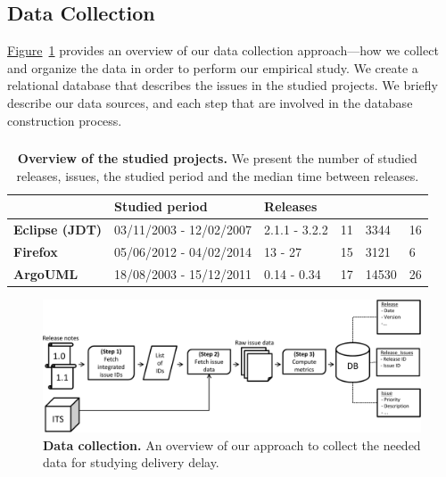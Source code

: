 \subsection{Data Collection}

\hyperref[ch4:fig:overview]{Figure}~\ref{ch4:fig:overview} provides an overview of our
data collection approach---how we collect and organize the data in order to
perform our empirical study. We create a relational database that describes the
\DIFdelbegin {}\DIFdelend \DIFaddbegin {}\DIFaddend issues in the studied projects. We briefly describe our
data sources, and each step that are involved in the database construction process. 

\subsubsection*{\DIFdelbegin \textbf{\textit{}%
}%
\DIFdelend \DIFaddbegin \textbf{\textit{}}\DIFaddend }


\begin{table}
	\footnotesize
	\caption{\textbf{Overview of the studied projects.} We present the number
	of studied releases, issues, the studied period and the median time
	between releases.}
	\label{ch4:tbl:consideredReleases}
	\begin{tabular}{L{1.65cm}C{2.5cm}C{1.5cm}C{1.0cm}R{2.45cm}R{4.25cm}}
		\hline 
		 & \textbf{Studied period} &
		\textbf{Releases} & 
		& 
		 & \tabularnewline
		\hline 
		\hline 
		\textbf{Eclipse (JDT)} & 03/11/2003 - 12/02/2007 & 2.1.1
		- 3.2.2 & 11 & 3344 & 16\tabularnewline
		\hline 
		\textbf{Firefox} & 05/06/2012 - 04/02/2014 & 13 - 27 &
		15 & 3121 & 6\tabularnewline
		\hline 
		\textbf{ArgoUML} & 18/08/2003 - 15/12/2011 & 0.14 - 0.34
		& 17 & 14530 & 26 \tabularnewline
		\hline 
	\end{tabular}
\end{table}

\begin{figure}
	\centering
	\includegraphics[width=\textwidth]{chapters/chapter4/figures/database_construction.pdf}
	\caption{\textbf{Data collection.} An overview of our approach to
	collect the needed data for studying delivery delay.}
	\label{ch4:fig:overview}
\end{figure} 

